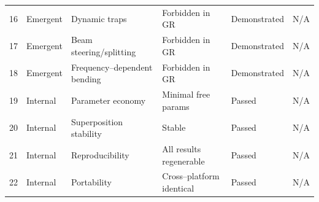 \documentclass{article}
\begin{document}
\begin{landscape}
\begin{table}[h!]
\begin{tabular}{|c|l|l|l|l|l|}
16 & Emergent & Dynamic traps & Forbidden in GR & Demonstrated & N/A \\
17 & Emergent & Beam steering/splitting & Forbidden in GR & Demonstrated & N/A \\
18 & Emergent & Frequency--dependent bending & Forbidden in GR & Demonstrated & N/A \\
19 & Internal & Parameter economy & Minimal free params & Passed & N/A \\
20 & Internal & Superposition stability & Stable & Passed & N/A \\
21 & Internal & Reproducibility & All results regenerable & Passed & N/A \\
22 & Internal & Portability & Cross--platform identical & Passed & N/A \\
\hline
\end{tabular}
\end{table}
\end{landscape}
\end{document}

